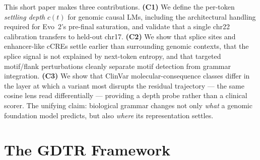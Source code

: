 \documentclass{article}
\theoremstyle{plain}
\theoremstyle{definition}
\theoremstyle{remark}
\newcommand{\gDTR}{\textsc{GDTR}}
\begin{document}
This short paper makes three contributions. \textbf{(C1)} We define the per-token \emph{settling depth} $c(t)$ for genomic causal LMs, including the architectural handling required for Evo~2's pre-final saturation, and validate that a single chr22 calibration transfers to held-out chr17. \textbf{(C2)} We show that splice sites and enhancer-like cCREs settle earlier than surrounding genomic contexts, that the splice signal is not explained by next-token entropy, and that targeted motif/flank perturbations cleanly separate motif detection from grammar integration. \textbf{(C3)} We show that ClinVar molecular-consequence classes differ in the layer at which a variant most disrupts the residual trajectory
--- the same cosine lens read differentially --- providing a depth probe rather than a clinical scorer. The unifying claim: biological grammar changes not only \emph{what} a genomic foundation model predicts, but also \emph{where} its representation settles.

\section{The \gDTR{} Framework}
\label{sec:framework}
\end{document}
